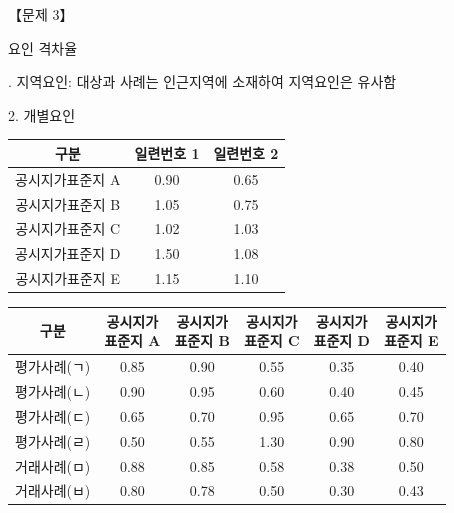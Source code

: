 \begin{longquestion}{【문제 3】}
{\par}
\medskip{} 요인 격차율 \par
\medskip{}. 지역요인: 대상과 사례는 인근지역에 소재하여 지역요인은 유사함 \par
2. 개별요인 \par
{\small\centering
\begin{tabular}{|c|c|c|}\hline
구분 & 일련번호 1 & 일련번호 2 \\\hline
공시지가표준지 A & 0.90 & 0.65 \\\hline
공시지가표준지 B & 1.05 & 0.75 \\\hline
공시지가표준지 C & 1.02 & 1.03 \\\hline
공시지가표준지 D & 1.50 & 1.08 \\\hline
공시지가표준지 E & 1.15 & 1.10 \\\hline
\end{tabular}\par}
\vspace{0.5em}
\par{\small\centering
\begin{tabular}{|c|c|c|c|c|c|}\hline
구분 & \makecell{공시지가\\표준지 A} & \makecell{공시지가\\표준지 B} & \makecell{공시지가\\표준지 C} & \makecell{공시지가\\표준지 D} & \makecell{공시지가\\표준지 E} \\\hline
평가사례(ㄱ) & 0.85 & 0.90 & 0.55 & 0.35 & 0.40 \\\hline
평가사례(ㄴ) & 0.90 & 0.95 & 0.60 & 0.40 & 0.45 \\\hline
평가사례(ㄷ) & 0.65 & 0.70 & 0.95 & 0.65 & 0.70 \\\hline
평가사례(ㄹ) & 0.50 & 0.55 & 1.30 & 0.90 & 0.80 \\\hline
거래사례(ㅁ) & 0.88 & 0.85 & 0.58 & 0.38 & 0.50 \\\hline
거래사례(ㅂ) & 0.80 & 0.78 & 0.50 & 0.30 & 0.43 \\\hline

\end{tabular}}
\end{longquestion}
